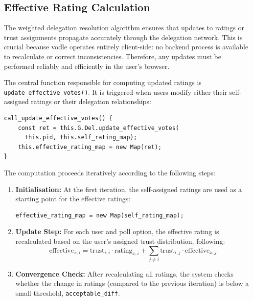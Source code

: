 \subsection{Effective Rating Calculation}

The weighted delegation resolution algorithm ensures that updates to ratings or trust assignments propagate accurately through the delegation network. This is crucial because vodle operates entirely client-side: no backend process is available to recalculate or correct inconsistencies. Therefore, any updates must be performed reliably and efficiently in the user's browser.

The central function responsible for computing updated ratings is \texttt{update\_effective\_votes()}. It is triggered when users modify either their self-assigned ratings or their delegation relationships:

\begin{verbatim}
call_update_effective_votes() {
    const ret = this.G.Del.update_effective_votes(
      this.pid, this.self_rating_map);
    this.effective_rating_map = new Map(ret);
}
\end{verbatim}

The computation proceeds iteratively according to the following steps:

\begin{enumerate}
    \item \textbf{Initialisation:} At the first iteration, the self-assigned ratings are used as a starting point for the effective ratings:
    \begin{verbatim}
effective_rating_map = new Map(self_rating_map);
    \end{verbatim}
    \item \textbf{Update Step:} For each user and poll option, the effective rating is recalculated based on the user's assigned trust distribution, following:
    \begin{equation}
      \text{effective}_{x, i} = \text{trust}_{i,i} \cdot \text{rating}_{x,i} + \sum_{j \neq i} \text{trust}_{i,j} \cdot \text{effective}_{x,j}
      \label{eq:effective_rating}
    \end{equation}      
    \item \textbf{Convergence Check:} After recalculating all ratings, the system checks whether the change in ratings (compared to the previous iteration) is below a small threshold, \texttt{acceptable\_diff}.
\end{enumerate}


